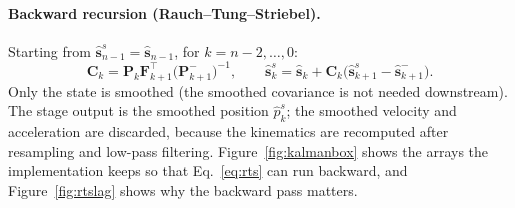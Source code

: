 \documentclass[11pt,a4paper]{article}
\begin{document}
\paragraph{Backward recursion (Rauch--Tung--Striebel).} Starting from
$\hat{\bm{s}}_{n-1}^{s} = \hat{\bm{s}}_{n-1}$, for $k = n-2, \dots, 0$:
\begin{equation}
  \bm{C}_k = \bm{P}_k \bm{F}_{k+1}^{\!\top} \big(\bm{P}_{k+1}^-\big)^{-1},
  \qquad
  \hat{\bm{s}}_k^{s} = \hat{\bm{s}}_k + \bm{C}_k\big(\hat{\bm{s}}_{k+1}^{s} - \hat{\bm{s}}_{k+1}^{-}\big).
  \label{eq:rts}
\end{equation}
Only the state is smoothed (the smoothed covariance is not needed downstream).
The stage output is the smoothed position $\hat p_k^{s}$; the smoothed velocity
and acceleration are discarded, because the kinematics are recomputed after
resampling and low-pass filtering. Figure~\ref{fig:kalmanbox} shows the arrays
the implementation keeps so that Eq.~\eqref{eq:rts} can run backward, and
Figure~\ref{fig:rtslag} shows why the backward pass matters.
\end{document}
